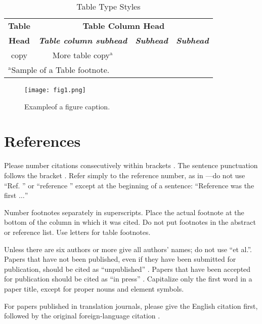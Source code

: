 \documentclass[conference]{IEEEtran}
\begin{document}
\begin{table}[htbp]
\caption{Table Type Styles}
\begin{center}
\begin{tabular}{|c|c|c|c|}
\hline
\textbf{Table}&\multicolumn{3}{|c|}{\textbf{Table Column Head}} \\
\cline{2-4} 
\textbf{Head} & \textbf{\textit{Table column subhead}}& \textbf{\textit{Subhead}}& \textbf{\textit{Subhead}} \\
\hline
copy& More table copy$^{\mathrm{a}}$& &  \\
\hline
\multicolumn{4}{l}{$^{\mathrm{a}}$Sample of a Table footnote.}
\end{tabular}
\label{tab1}
\end{center}
\end{table}

\begin{figure}[htbp]
\centerline{\texttt{[image: fig1.png]}}
        \caption{Example\footnotemark of a figure caption.}
\label{fig}
\end{figure}


\section*{References}

Please number citations consecutively within brackets \cite{b1}. The 
sentence punctuation follows the bracket \cite{b2}. Refer simply to the reference 
number, as in \cite{b3}---do not use ``Ref. \cite{b3}'' or ``reference \cite{b3}'' except at 
the beginning of a sentence: ``Reference \cite{b3} was the first $\ldots$''

Number footnotes separately in superscripts. Place the actual footnote at 
the bottom of the column in which it was cited. Do not put footnotes in the 
abstract or reference list. Use letters for table footnotes.

Unless there are six authors or more give all authors' names; do not use 
``et al.''. Papers that have not been published, even if they have been 
submitted for publication, should be cited as ``unpublished'' \cite{b4}. Papers 
that have been accepted for publication should be cited as ``in press'' \cite{b5}. 
Capitalize only the first word in a paper title, except for proper nouns and 
element symbols.

For papers published in translation journals, please give the English 
citation first, followed by the original foreign-language citation \cite{b6}.
\end{document}
